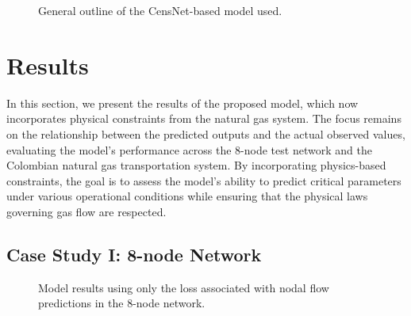 \begin{figure}
    \centering
    \setlength{}        
    \setlength{}
    \resizebox{\figurewidth}{\figureheight}{}
    \caption{General outline of the CensNet-based model used.}
        \label{fig:nonlineal_model_description}
\end{figure}

\section{Results}


In this section, we present the results of the proposed model, which now incorporates physical constraints from the natural gas system. The focus remains on the relationship between the predicted outputs and the actual observed values, evaluating the model's performance across the 8-node test network and the Colombian natural gas transportation system. By incorporating physics-based constraints, the goal is to assess the model's ability to predict critical parameters under various operational conditions while ensuring that the physical laws governing gas flow are respected.

\subsection{Case Study I: 8-node Network}




\begin{figure}
    \centering
    \setlength{}        
    \setlength{} 
    
    \caption{Model results using only the loss associated with nodal flow predictions in the 8-node network.}
    \label{fig:dummy_base_results}
\end{figure}


